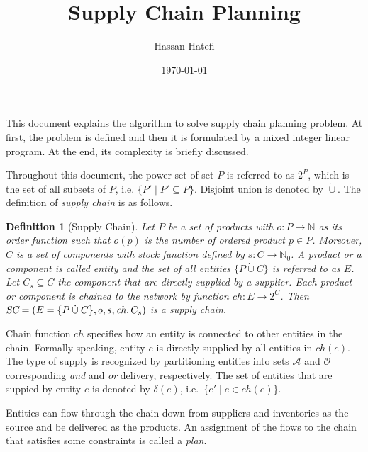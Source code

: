 \documentclass[a4paper]{article}
\newcommand{\nat}{\mathbb{N}}
\newtheorem{definition}{Definition}
\newcommand{\pow}[1]{2^{#1}}
\newcommand{\dotcup}{\mathbin{\dot{\cup}}}
\newcommand{\ands}{\mathcal{A}}
\newcommand{\ors}{\mathcal{O}}
\newcommand{\SC}{\textsl{SC}}
\newcommand{\chain}{\mathit{ch}}
\begin{document}
\author{Hassan Hatefi}
\title{Supply Chain Planning}
\date{\today}
\maketitle

This document explains the algorithm to solve supply chain planning
problem. At first, the problem is defined and then it is formulated by
a mixed integer linear program. At the end, its complexity is briefly
discussed.

Throughout this document, the power set of set $P$ is referred to as
$\pow{P}$, which is the set of all subsets of $P$, i.e. $\{P'\mid
P'\subseteq P\}$. Disjoint union is denoted by $\dot{\cup}$. The
definition of \emph{supply chain} is as follows.
\begin{definition}[Supply Chain]\label{def:sc}
  Let $P$ be a set of \emph{products} with $o:P\to\nat$ as its order
  function such that $o(p)$ is the number of ordered product $p\in
  P$. Moreover, $C$ is a set of \emph{components} with stock function
  defined by $s:C\to\nat_0$. A product or a component is called
  \emph{entity} and the set of all entities $\{P\dotcup C\}$ is
  referred to as $E$. Let $C_s\subseteq C$ the component that are
  directly supplied by a supplier. Each product or component is
  chained to the network by function $\chain:E\to\pow{C}$. Then
  $\SC=(E=\{P\dotcup C\},o,s,\chain,C_s)$ is a supply chain.
\end{definition}
Chain function $\chain$ specifies how an entity is connected to other entities
in the chain. Formally speaking, entity $e$ is directly supplied by all
entities in $\chain(e)$. The type of supply is recognized by partitioning
entities into sets $\ands$ and $\ors$ corresponding \emph{and} and \emph{or}
delivery, respectively. The set of entities that are suppied by entity $e$ is
denoted by $\delta(e)$, i.e.~$\{e'\mid e\in\chain(e)\}$.

Entities can flow through the chain down from suppliers and inventories as the
source and be delivered as the products. An assignment of the flows to the
chain that satisfies some constraints is called a \emph{plan}.
\end{document}
